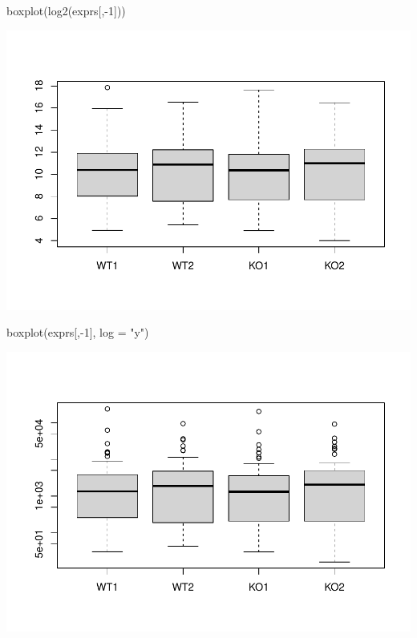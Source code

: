 \documentclass[
]{book}
\newenvironment{Shaded}{\begin{snugshade}}{\end{snugshade}}
\newcommand{\AttributeTok}[1]{\textcolor[rgb]{0.77,0.63,0.00}{#1}}
\newcommand{\DecValTok}[1]{\textcolor[rgb]{0.00,0.00,0.81}{#1}}
\newcommand{\FunctionTok}[1]{\textcolor[rgb]{0.00,0.00,0.00}{#1}}
\newcommand{\NormalTok}[1]{#1}
\newcommand{\SpecialCharTok}[1]{\textcolor[rgb]{0.00,0.00,0.00}{#1}}
\newcommand{\StringTok}[1]{\textcolor[rgb]{0.31,0.60,0.02}{#1}}
\begin{document}
\begin{Shaded}
\begin{Highlighting}[]
\FunctionTok{boxplot}\NormalTok{(}\FunctionTok{log2}\NormalTok{(exprs[,}\SpecialCharTok{{-}}\DecValTok{1}\NormalTok{]))}
\end{Highlighting}
\end{Shaded}

\includegraphics{images/unnamed-chunk-82-1.pdf}

\begin{Shaded}
\begin{Highlighting}[]
\FunctionTok{boxplot}\NormalTok{(exprs[,}\SpecialCharTok{{-}}\DecValTok{1}\NormalTok{], }\AttributeTok{log =} \StringTok{"y"}\NormalTok{)}
\end{Highlighting}
\end{Shaded}

\includegraphics{images/unnamed-chunk-83-1.pdf}
\end{document}
